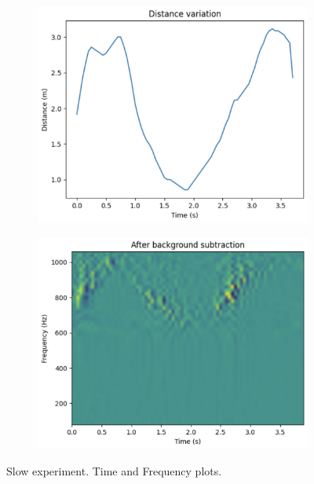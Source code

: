 \documentclass{lab}
\begin{document}
\begin{figure}[h]
    \centering
    \begin{subfigure}[b]{0.48\textwidth}
        \centering
        \includegraphics[width=\textwidth]{images/slow-time.png}
    \end{subfigure}
    \hfill
    \begin{subfigure}[b]{0.48\textwidth}
        \centering
        \includegraphics[width=\textwidth]{images/slow-freq.png}
    \end{subfigure}
    \caption{Slow experiment. Time and Frequency plots.}
\end{figure}
\end{document}
